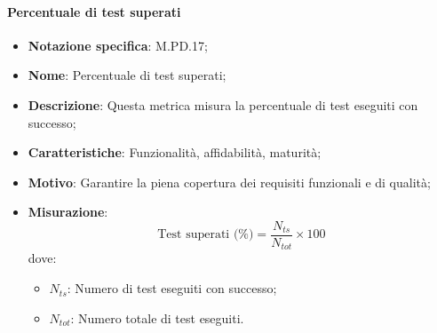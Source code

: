 \paragraph*{Percentuale di test superati}
\begin{itemize}
    \item \textbf{Notazione specifica}: M.PD.17;
    \item \textbf{Nome}: Percentuale di test superati;
    \item \textbf{Descrizione}: Questa metrica misura la percentuale di test eseguiti con successo;
    \item \textbf{Caratteristiche}: Funzionalità, affidabilità, maturità;
    \item \textbf{Motivo}: Garantire la piena copertura dei requisiti funzionali e di qualità;
    \item \textbf{Misurazione}:
    \[
    \text{Test superati (\%)} = \frac{N_{ts}}{N_{tot}} \times 100
    \]
    dove:
    \begin{itemize}
        \item $N_{ts}$: Numero di test eseguiti con successo;
        \item $N_{tot}$: Numero totale di test eseguiti.
    \end{itemize}
\end{itemize}
